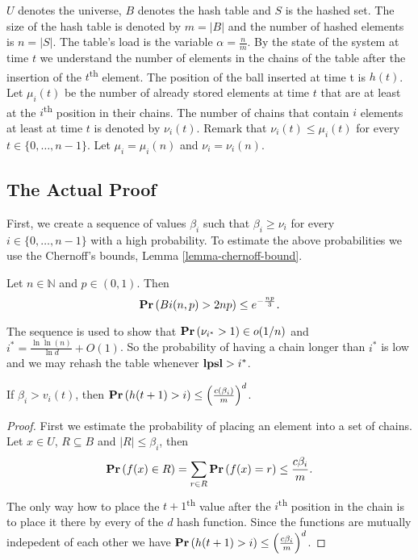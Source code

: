 $U$ denotes the universe, $B$ denotes the hash table and $S$ is the hashed set. The size of the hash table is denoted by $m = |B|$ and the number of hashed elements is $n = |S|$. The table's load is the variable $\alpha = \frac{n}{m}$. By the state of the system at time $t$ we understand the number of elements in the chains of the table after the insertion of the $t$\textsuperscript{th} element.
The position of the ball inserted at time t is $h(t)$. Let $\mu_i(t)$ be the number of already stored elements at time $t$ that are at least at the $i$\textsuperscript{th} position in their chains. The number of chains that contain $i$ elements at least at time $t$ is denoted by $\nu_i(t)$. Remark that $\nu_i(t) \leq \mu_i(t)$ for every $t \in \{0, \dots, n - 1 \}$. Let $\mu_i = \mu_i(n)$ and $\nu_i = \nu_i(n)$.

\subsection{The Actual Proof}
First, we create a sequence of values $\beta_i$ such that $\beta_i \geq \nu_i$ for every $i \in \{0, \dots, n - 1\}$ with a high probability. To estimate the above probabilities we use the Chernoff's bounds, Lemma \ref{lemma-chernoff-bound}.

\begin{lemma}
\label{lemma-chernoff-bound}
Let $n \in \mathbb{N}$ and $p \in (0, 1)$. Then $$\mathbf{Pr}\left(Bi(n, p) > 2np\right) \leq e ^ {- \frac{np}{3}} \textit{.}$$
\end{lemma}

The sequence is used to show that $\mathbf{Pr}\left(\nu_{i^{*}} > 1\right) \in o(1/n)$ and $i^* = \frac{\ln \ln (n)}{\ln d} + O(1)$. So the probability of having a chain longer than $i^*$ is low and we may rehash the table whenever $\mathbf{lpsl} > i^*$.

\begin{lemma}
\label{lemma-height-of-inserted-ball}
If $\beta_i > v_i(t)$, then $\mathbf{Pr}\left(h(t + 1) > i\right) \leq \left(\frac{c(\beta_i)}{m}\right) ^ d$.
\end{lemma}
\begin{proof}
First we estimate the probability of placing an element into a set of chains. Let $x \in U$, $R \subseteq B$ and $|R| \leq \beta_i$, then $$\mathbf{Pr}\left(f(x) \in R\right) = \displaystyle\sum_{r \in R} \mathbf{Pr}\left(f(x) = r\right) \leq \frac{c\beta_i}{m} \textit{.}$$
The only way how to place the $t + 1$\textsuperscript{th} value after the $i$\textsuperscript{th} position in the chain is to place it there by every of the $d$ hash function. Since the functions are mutually indepedent of each other we have $\mathbf{Pr}\left(h(t + 1) > i\right) \leq \left(\frac{c \beta_i}{m}\right) ^ d$.
\end{proof}


